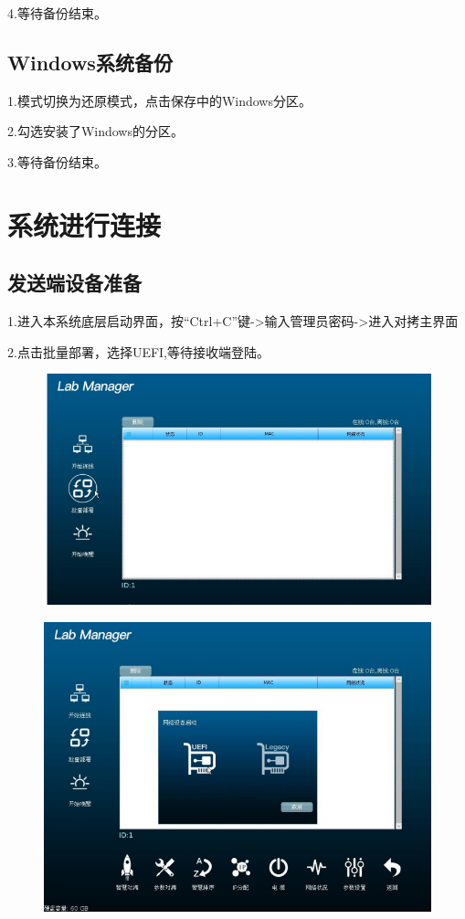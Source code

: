 \documentclass[openbib]{article}
\begin{document}
4.等待备份结束。

\subsection{Windows系统备份}
1.模式切换为还原模式，点击保存中的Windows分区。

2.勾选安装了Windows的分区。

3.等待备份结束。

\section{系统进行连接}
\subsection{发送端设备准备}
1.进入本系统底层启动界面，按“Ctrl+C”键->输入管理员密码->进入对拷主界面

2.点击批量部署，选择UEFI,等待接收端登陆。
\begin{figure}[H]
	\centering
	\includegraphics[scale=0.4]{59}
\end{figure}

\begin{figure}[H]
	\centering
	\includegraphics[scale=0.5]{60}
\end{figure}
\end{document}
